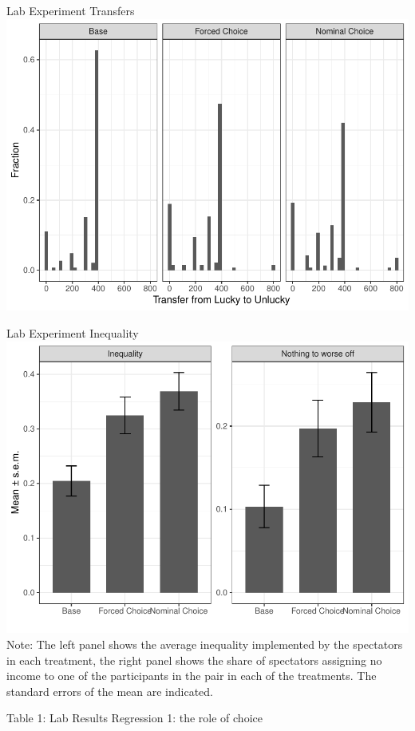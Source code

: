 \documentclass{beamer}
\begin{document}

  	\begin{frame}{Lab Experiment Transfers}
		\includegraphics[height=.9\textheight]{../graphs/histograms_lab.pdf}
	\end{frame}
\begin{frame}{Lab Experiment Inequality}
	\includegraphics[height=.9\textheight]{../graphs/mean_ineq_nothing_lab.pdf}
	Note: The left panel shows the average inequality implemented by the spectators in each
	treatment, the right panel shows the share of spectators assigning no income to one of the
	participants in the pair in each of the treatments. The standard errors of the mean are indicated.
\end{frame}
		\begin{frame}{Table 1: Lab Results Regression 1: the role of choice}{\tiny

	}  %
	\end{frame}
\end{document}
